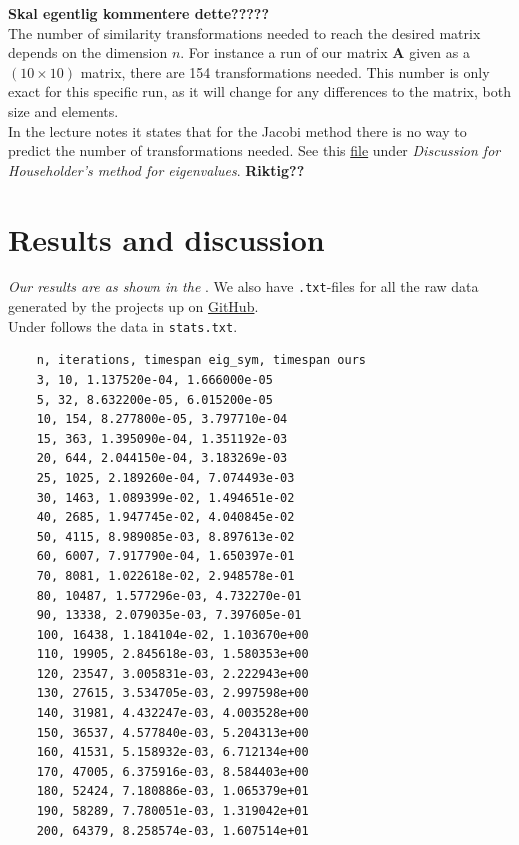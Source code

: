\documentclass{article}
\begin{document}
\begin{multicols}{2}
\textbf{Skal egentlig kommentere dette?????} \\

The number of similarity transformations needed to reach the desired matrix depends on the dimension $n$. For instance a run of our matrix \textbf{A} given as a $(10 \times 10)$ matrix, there are 154 transformations needed. This number is only exact for this specific run, as it will change for any differences to the matrix, both size and elements. \\

In the lecture notes it states that for the Jacobi method there is no way to predict the number of transformations needed. See this \href{http://compphysics.github.io/ComputationalPhysics/doc/pub/eigvalues/html/eigvalues.html}{file} under \textit{Discussion for Householder's method for eigenvalues}. \textbf{Riktig??} \\




\vspace{1cm}

\section{Results and discussion} \label{sec:Results}

  \textit{Our results are as shown in the }. We also have \texttt{.txt}-files for all the raw data generated by the projects up on \href{https://github.com/Erikbgram/Fys3150}{GitHub}. \\

  Under follows the data in \texttt{stats.txt}.

  \begin{verbatim}
    n, iterations, timespan eig_sym, timespan ours
    3, 10, 1.137520e-04, 1.666000e-05
    5, 32, 8.632200e-05, 6.015200e-05
    10, 154, 8.277800e-05, 3.797710e-04
    15, 363, 1.395090e-04, 1.351192e-03
    20, 644, 2.044150e-04, 3.183269e-03
    25, 1025, 2.189260e-04, 7.074493e-03
    30, 1463, 1.089399e-02, 1.494651e-02
    40, 2685, 1.947745e-02, 4.040845e-02
    50, 4115, 8.989085e-03, 8.897613e-02
    60, 6007, 7.917790e-04, 1.650397e-01
    70, 8081, 1.022618e-02, 2.948578e-01
    80, 10487, 1.577296e-03, 4.732270e-01
    90, 13338, 2.079035e-03, 7.397605e-01
    100, 16438, 1.184104e-02, 1.103670e+00
    110, 19905, 2.845618e-03, 1.580353e+00
    120, 23547, 3.005831e-03, 2.222943e+00
    130, 27615, 3.534705e-03, 2.997598e+00
    140, 31981, 4.432247e-03, 4.003528e+00
    150, 36537, 4.577840e-03, 5.204313e+00
    160, 41531, 5.158932e-03, 6.712134e+00
    170, 47005, 6.375916e-03, 8.584403e+00
    180, 52424, 7.180886e-03, 1.065379e+01
    190, 58289, 7.780051e-03, 1.319042e+01
    200, 64379, 8.258574e-03, 1.607514e+01
  \end{verbatim}


\end{multicols}
\end{document}
